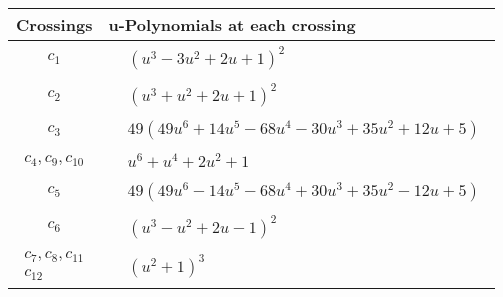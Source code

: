 \documentclass[1p]{elsarticle_modified}
\theoremstyle{definition}
\begin{document}
\begin{tabular}{m{50pt}|m{274pt}}
Crossings & \hspace{64pt}u-Polynomials at each crossing \\
\hline $$\begin{aligned}c_{1}\end{aligned}$$&$\begin{aligned}
&(u^3-3 u^2+2 u+1)^2
\end{aligned}$\\
\hline $$\begin{aligned}c_{2}\end{aligned}$$&$\begin{aligned}
&(u^3+u^2+2 u+1)^2
\end{aligned}$\\
\hline $$\begin{aligned}c_{3}\end{aligned}$$&$\begin{aligned}
&49(49 u^6+14 u^5-68 u^4-30 u^3+35 u^2+12 u+5)
\end{aligned}$\\
\hline $$\begin{aligned}c_{4},c_{9},c_{10}\end{aligned}$$&$\begin{aligned}
&u^6+u^4+2 u^2+1
\end{aligned}$\\
\hline $$\begin{aligned}c_{5}\end{aligned}$$&$\begin{aligned}
&49(49 u^6-14 u^5-68 u^4+30 u^3+35 u^2-12 u+5)
\end{aligned}$\\
\hline $$\begin{aligned}c_{6}\end{aligned}$$&$\begin{aligned}
&(u^3- u^2+2 u-1)^2
\end{aligned}$\\
\hline $$\begin{aligned}c_{7},c_{8},c_{11}\\c_{12}\end{aligned}$$&$\begin{aligned}
&(u^2+1)^3
\end{aligned}$\\
\hline
\end{tabular}\\~\\
\newpage\renewcommand{\arraystretch}{1}
\end{document}
